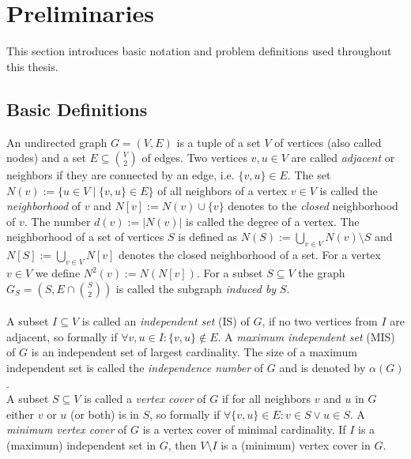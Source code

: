 \documentclass[12pt,a4paper,twoside]{scrartcl}
\numberwithin{equation}{section}
\begin{document}
\clearpage

\section{Preliminaries} \label{sec2}

This section introduces basic notation and problem definitions used throughout this thesis.

\subsection{Basic Definitions}

An undirected graph $G=(V,E)$ is a tuple of a set $V$ of vertices (also called nodes) and a set $E\subseteq \binom{V}{2}$ of edges. Two vertices $v,u\in V$ are called \textit{adjacent} or neighbors if they are connected by an edge, i.e. $\{v,u\}\in E$. The set $N(v) := \{u \in V\;|\; \{v,u\}\in E \}$ of all neighbors of a vertex $v\in V$ is called the \textit{neighborhood} of $v$ and $N[v] := N(v) \cup \{v\}$ denotes to the \textit{closed} neighborhood of $v$. The number $d(v):=|N(v)|$ is called the degree of a vertex. The neighborhood of a set of vertices $S$ is defined as $N(S) := \bigcup_{v\in V}N(v)\setminus S$ and $N[S] := \bigcup_{v\in V}N[v]$ denotes the closed neighborhood of a set. For a vertex $v\in V$ we define $N^2(v) := N(N[v])$. For a subset $S\subseteq V$ the graph $G_S=(S, E\cap\binom{S}{2})$ is called the subgraph \textit{induced by} $S$.\paragraph{}
A subset $I\subseteq V$ is called an \emph{independent set} (IS) of $G$, if no two vertices from $I$ are adjacent, so formally if $\forall v,u\in I: \{v,u\}\notin E$. A \emph{maximum independent set} (MIS) of $G$ is an independent set of largest cardinality. The size of a maximum independent set is called the \emph{independence number} of $G$ and is denoted by $\alpha(G)$. \\
A subset $S\subseteq V$ is called a \emph{vertex cover} of $G$ if for all neighbors $v$ and $u$ in $G$ either $v$ or $u$ (or both) is in $S$, so formally if $\forall \{v,u\}\in E: v\in S \vee u\in S$. A \emph{minimum vertex cover} of $G$ is a vertex cover of minimal cardinality. If $I$ is a (maximum) independent set in $G$, then $V\setminus I$ is a (minimum) vertex cover in $G$.\\
\end{document}
